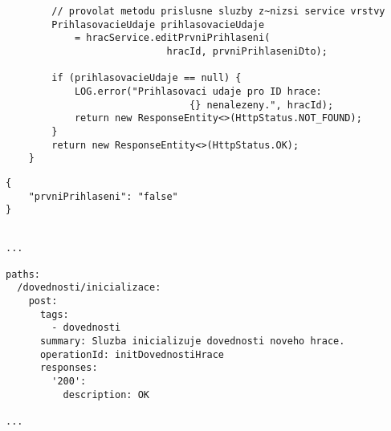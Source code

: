 \documentclass[twoside, 12pt]{article}
\begin{document}
{{\begin{lstlisting}
        // provolat metodu prislusne sluzby z~nizsi service vrstvy
        PrihlasovacieUdaje prihlasovacieUdaje
            = hracService.editPrvniPrihlaseni(
                            hracId, prvniPrihlaseniDto);

        if (prihlasovacieUdaje == null) {
            LOG.error("Prihlasovaci udaje pro ID hrace:
                                {} nenalezeny.", hracId);
            return new ResponseEntity<>(HttpStatus.NOT_FOUND);
        }
        return new ResponseEntity<>(HttpStatus.OK);
    }
\end{lstlisting}

\clearpage


\vspace{10}



\vspace{10}


\begin{lstlisting}
{
    "prvniPrihlaseni": "false"
}
\end{lstlisting}

\vspace{10}


\vspace{10}




\begin{lstlisting}

...

paths:
  /dovednosti/inicializace:
    post:
      tags:
        - dovednosti
      summary: Sluzba inicializuje dovednosti noveho hrace.
      operationId: initDovednostiHrace
      responses:
        '200':
          description: OK

...

\end{lstlisting}

}}
\end{document}
